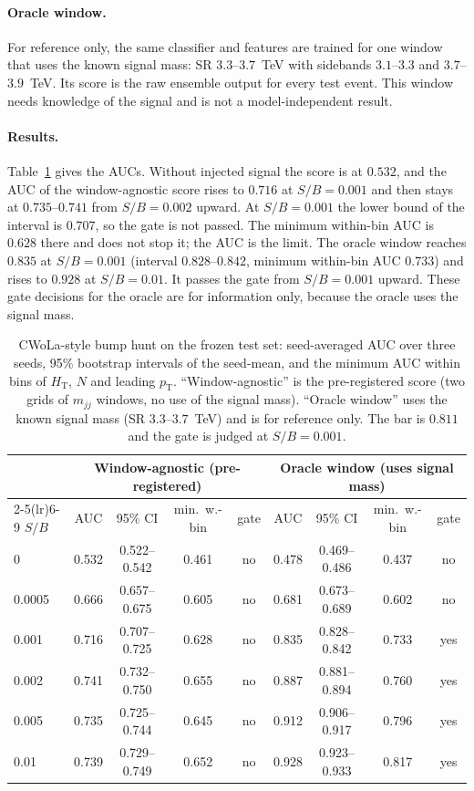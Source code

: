 \documentclass[11pt,a4paper]{article}
\newcommand{\pt}{\ensuremath{p_\mathrm{T}}\xspace}
\newcommand{\HT}{\ensuremath{H_\mathrm{T}}\xspace}
\newcommand{\mjj}{\ensuremath{m_{jj}}\xspace}
\begin{document}
\paragraph{Oracle window.}
For reference only, the same classifier and features are trained for one window that uses the known signal mass:
SR $3.3$--$3.7$~TeV with sidebands $3.1$--$3.3$ and $3.7$--$3.9$~TeV. Its score is the raw ensemble output
for every test event. This window needs knowledge of the signal and is not a model-independent result.

\paragraph{Results.}
Table~\ref{tab:cwola} gives the AUCs. Without injected signal the score is at $0.532$, and the
AUC of the window-agnostic score rises to $0.716$ at $S/B=0.001$ and then stays at $0.735$--$0.741$ from
$S/B=0.002$ upward. At $S/B=0.001$ the lower bound of the interval is $0.707$, so the gate is not passed.
The minimum within-bin AUC is $0.628$ there and does not stop it; the AUC is the limit. The oracle window
reaches $0.835$ at $S/B=0.001$ (interval $0.828$--$0.842$, minimum within-bin AUC $0.733$) and rises to $0.928$
at $S/B=0.01$. It passes the gate from $S/B=0.001$ upward. These gate decisions for the oracle are for
information only, because the oracle uses the signal mass.

\begin{table}[t]
\centering
\caption{CWoLa-style bump hunt on the frozen test set: seed-averaged AUC over three seeds, 95\% bootstrap
intervals of the seed-mean, and the minimum AUC within bins of \HT, $N$ and leading \pt. ``Window-agnostic'' is the
pre-registered score (two grids of \mjj windows, no use of the signal mass). ``Oracle window'' uses the known signal mass
(SR $3.3$--$3.7$~TeV) and is for reference only. The bar is $0.811$ and the gate is judged at $S/B=0.001$.}
\label{tab:cwola}
\footnotesize\setlength{\tabcolsep}{4pt}
\begin{tabular}{lcccccccc}
\toprule
 & \multicolumn{4}{c}{Window-agnostic (pre-registered)} & \multicolumn{4}{c}{Oracle window (uses signal mass)} \\
\cmidrule(lr){2-5}\cmidrule(lr){6-9}
$S/B$ & AUC & 95\% CI & min.\ w.-bin & gate & AUC & 95\% CI & min.\ w.-bin & gate \\
\midrule
0      & 0.532 & 0.522--0.542 & 0.461 & no  & 0.478 & 0.469--0.486 & 0.437 & no  \\
0.0005 & 0.666 & 0.657--0.675 & 0.605 & no  & 0.681 & 0.673--0.689 & 0.602 & no  \\
0.001  & 0.716 & 0.707--0.725 & 0.628 & no  & 0.835 & 0.828--0.842 & 0.733 & yes \\
0.002  & 0.741 & 0.732--0.750 & 0.655 & no  & 0.887 & 0.881--0.894 & 0.760 & yes \\
0.005  & 0.735 & 0.725--0.744 & 0.645 & no  & 0.912 & 0.906--0.917 & 0.796 & yes \\
0.01   & 0.739 & 0.729--0.749 & 0.652 & no  & 0.928 & 0.923--0.933 & 0.817 & yes \\
\bottomrule
\end{tabular}
\end{table}
\end{document}

